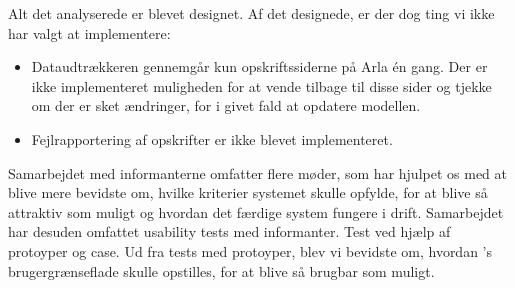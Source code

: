 Alt det analyserede er blevet designet. Af det designede, er der dog ting vi ikke har valgt at implementere:
\begin{itemize}
\item Dataudtrækkeren gennemgår kun opskriftssiderne på Arla én gang. Der er ikke implementeret muligheden for at vende tilbage til disse sider og tjekke om der er sket ændringer, for i givet fald at opdatere modellen.
\item Fejlrapportering af opskrifter er ikke blevet implementeret.
\end{itemize}

Samarbejdet med informanterne omfatter flere møder, som har hjulpet os med at blive mere bevidste om, hvilke kriterier systemet skulle opfylde, for at blive så attraktiv som muligt og hvordan det færdige system fungere i drift. Samarbejdet har desuden omfattet usability tests med informanter. Test ved hjælp af protoyper og case. Ud fra tests med protoyper, blev vi bevidste om, hvordan \Foodl{}'s brugergrænseflade skulle opstilles, for at blive så brugbar som muligt. 



